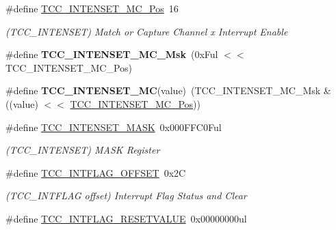 \begin{DoxyCompactItemize}
\item 
\hypertarget{group___s_a_m_l21___t_c_c_gad12797cbdc31045dd1377afb6a6278cb}{}\#define \hyperlink{group___s_a_m_l21___t_c_c_gad12797cbdc31045dd1377afb6a6278cb}{T\+C\+C\+\_\+\+I\+N\+T\+E\+N\+S\+E\+T\+\_\+\+M\+C\+\_\+\+Pos}~16\label{group___s_a_m_l21___t_c_c_gad12797cbdc31045dd1377afb6a6278cb}

\begin{DoxyCompactList}\small\item\em (T\+C\+C\+\_\+\+I\+N\+T\+E\+N\+S\+E\+T) Match or Capture Channel x Interrupt Enable \end{DoxyCompactList}\item 
\hypertarget{group___s_a_m_l21___t_c_c_ga733fb9e0d131ba26dd2ef7ce2f1b0556}{}\#define {\bfseries T\+C\+C\+\_\+\+I\+N\+T\+E\+N\+S\+E\+T\+\_\+\+M\+C\+\_\+\+Msk}~(0x\+Ful $<$$<$ T\+C\+C\+\_\+\+I\+N\+T\+E\+N\+S\+E\+T\+\_\+\+M\+C\+\_\+\+Pos)\label{group___s_a_m_l21___t_c_c_ga733fb9e0d131ba26dd2ef7ce2f1b0556}

\item 
\hypertarget{group___s_a_m_l21___t_c_c_ga172831875735b7f04ba40849104ecf3f}{}\#define {\bfseries T\+C\+C\+\_\+\+I\+N\+T\+E\+N\+S\+E\+T\+\_\+\+M\+C}(value)~(T\+C\+C\+\_\+\+I\+N\+T\+E\+N\+S\+E\+T\+\_\+\+M\+C\+\_\+\+Msk \& ((value) $<$$<$ \hyperlink{group___s_a_m_l21___t_c_c_gad12797cbdc31045dd1377afb6a6278cb}{T\+C\+C\+\_\+\+I\+N\+T\+E\+N\+S\+E\+T\+\_\+\+M\+C\+\_\+\+Pos}))\label{group___s_a_m_l21___t_c_c_ga172831875735b7f04ba40849104ecf3f}

\item 
\hypertarget{group___s_a_m_l21___t_c_c_gacea33da022369326bdf07b5bf4e6a9a9}{}\#define \hyperlink{group___s_a_m_l21___t_c_c_gacea33da022369326bdf07b5bf4e6a9a9}{T\+C\+C\+\_\+\+I\+N\+T\+E\+N\+S\+E\+T\+\_\+\+M\+A\+S\+K}~0x000\+F\+F\+C0\+Ful\label{group___s_a_m_l21___t_c_c_gacea33da022369326bdf07b5bf4e6a9a9}

\begin{DoxyCompactList}\small\item\em (T\+C\+C\+\_\+\+I\+N\+T\+E\+N\+S\+E\+T) M\+A\+S\+K Register \end{DoxyCompactList}\item 
\hypertarget{group___s_a_m_l21___t_c_c_ga693b9d7839e636ff8db758c2e18ddf5e}{}\#define \hyperlink{group___s_a_m_l21___t_c_c_ga693b9d7839e636ff8db758c2e18ddf5e}{T\+C\+C\+\_\+\+I\+N\+T\+F\+L\+A\+G\+\_\+\+O\+F\+F\+S\+E\+T}~0x2\+C\label{group___s_a_m_l21___t_c_c_ga693b9d7839e636ff8db758c2e18ddf5e}

\begin{DoxyCompactList}\small\item\em (T\+C\+C\+\_\+\+I\+N\+T\+F\+L\+A\+G offset) Interrupt Flag Status and Clear \end{DoxyCompactList}\item 
\hypertarget{group___s_a_m_l21___t_c_c_ga4542f08e75dd5ceb9560c322374c8313}{}\#define \hyperlink{group___s_a_m_l21___t_c_c_ga4542f08e75dd5ceb9560c322374c8313}{T\+C\+C\+\_\+\+I\+N\+T\+F\+L\+A\+G\+\_\+\+R\+E\+S\+E\+T\+V\+A\+L\+U\+E}~0x00000000ul\label{group___s_a_m_l21___t_c_c_ga4542f08e75dd5ceb9560c322374c8313}


\end{DoxyCompactItemize}
